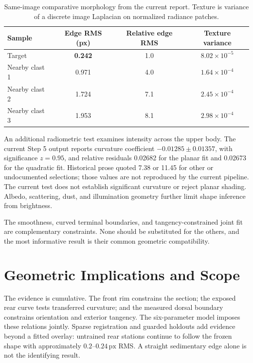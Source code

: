 \documentclass[11pt,letterpaper]{article}
\newcommand{\px}{\,\mathrm{px}}
\begin{document}
\begin{table}[ht]
\centering\small
\caption{Same-image comparative morphology from the current report. Texture is variance of a discrete image Laplacian on normalized radiance patches.}
\label{tab:rocks}
\begin{tabularx}{\linewidth}{@{}l c c c@{}}
\toprule
\textbf{Sample} & \textbf{Edge RMS (px)} & \textbf{Relative edge RMS} & \textbf{Texture variance} \\
\midrule
Target & \textbf{0.242} & 1.0 & \(8.02\times10^{-5}\) \\
Nearby clast 1 & 0.971 & 4.0 & \(1.64\times10^{-4}\) \\
Nearby clast 2 & 1.724 & 7.1 & \(2.45\times10^{-4}\) \\
Nearby clast 3 & 1.953 & 8.1 & \(2.98\times10^{-4}\) \\
\bottomrule
\end{tabularx}
\end{table}

An additional radiometric test examines intensity across the upper body. The current Step 5 output reports curvature coefficient $-0.01285 \pm 0.01357$, with significance $z=0.95$, and relative residuals 0.02682 for the planar fit and 0.02673 for the quadratic fit. Historical prose quoted 7.38 or 11.45 for other or undocumented selections; those values are not reproduced by the current pipeline. The current test does not establish significant curvature or reject planar shading. Albedo, scattering, dust, and illumination geometry further limit shape inference from brightness.

The smoothness, curved terminal boundaries, and tangency-constrained joint fit are complementary constraints. None should be substituted for the others, and the most informative result is their common geometric compatibility.

\section{Geometric Implications and Scope}
\label{sec:discussion}

The evidence is cumulative. The front rim constrains the section; the exposed rear curve tests transferred curvature; and the measured dorsal boundary constrains orientation and exterior tangency. The six-parameter model imposes these relations jointly. Sparse registration and guarded holdouts add evidence beyond a fitted overlay: untrained rear stations continue to follow the frozen shape with approximately $0.2$--$0.24\px$ RMS. A straight sedimentary edge alone is not the identifying result.
\end{document}
